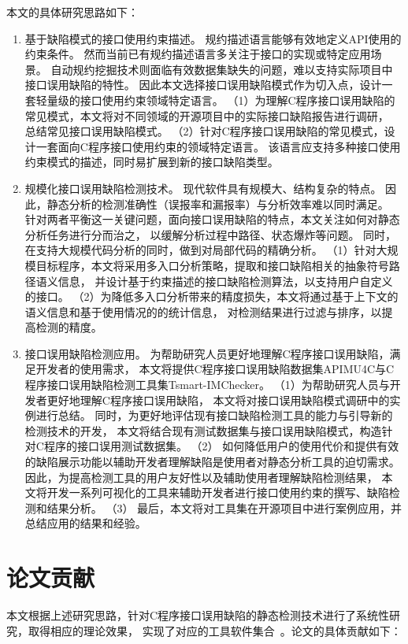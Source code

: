本文的具体研究思路如下：
\begin{enumerate}
	\item {\kaishu 基于缺陷模式的接口使用约束描述。}
	规约描述语言能够有效地定义API使用的约束条件。
	然而当前已有规约描述语言多关注于接口的实现或特定应用场景。
	自动规约挖掘技术则面临有效数据集缺失的问题，难以支持实际项目中接口误用缺陷的特性。
	因此本文选择接口误用缺陷模式作为切入点，设计一套轻量级的接口使用约束领域特定语言。
	（1）为理解C程序接口误用缺陷的常见模式，本文将对不同领域的开源项目中的实际接口缺陷报告进行调研，
	总结常见接口误用缺陷模式。
	（2）针对C程序接口误用缺陷的常见模式，设计一套面向C程序接口使用约束的领域特定语言。
	该语言应支持多种接口使用约束模式的描述，同时易扩展到新的接口缺陷类型。
	
	\item {\kaishu 规模化接口误用缺陷检测技术。}
	现代软件具有规模大、结构复杂的特点。
	因此，静态分析的检测准确性（误报率和漏报率）与分析效率难以同时满足。
	针对两者平衡这一关键问题，面向接口误用缺陷的特点，本文关注如何对静态分析任务进行分而治之，
	以缓解分析过程中路径、状态爆炸等问题。
	同时，在支持大规模代码分析的同时，做到对局部代码的精确分析。
	（1）针对大规模目标程序，本文将采用多入口分析策略，提取和接口缺陷相关的抽象符号路径语义信息，
	并设计基于约束描述的接口缺陷检测算法，以支持用户自定义的接口。
	（2）为降低多入口分析带来的精度损失，本文将通过基于上下文的语义信息和基于使用情况的的统计信息，
	对检测结果进行过滤与排序，以提高检测的精度。
	
	\item {\kaishu 接口误用缺陷检测应用。}
	为帮助研究人员更好地理解C程序接口误用缺陷，满足开发者的使用需求，
	本文将提供C程序接口误用缺陷数据集APIMU4C与C程序接口误用缺陷检测工具集Tsmart-IMChecker。
	（1）为帮助研究人员与开发者更好地理解C程序接口误用缺陷，
	本文将对接口误用缺陷模式调研中的实例进行总结。
	同时，为更好地评估现有接口缺陷检测工具的能力与引导新的检测技术的开发，
	本文将结合现有测试数据集与接口误用缺陷模式，构造针对C程序的接口误用测试数据集。
	（2）
	如何降低用户的使用代价和提供有效的缺陷展示功能以辅助开发者理解缺陷是使用者对静态分析工具的迫切需求。
	因此，为提高检测工具的用户友好性以及辅助使用者理解缺陷检测结果，
	本文将开发一系列可视化的工具来辅助开发者进行接口使用约束的撰写、缺陷检测和结果分析。
	（3）
	最后，本文将对工具集在开源项目中进行案例应用，并总结应用的结果和经验。	
\end{enumerate}




\section{论文贡献}
本文根据上述研究思路，针对C程序接口误用缺陷的静态检测技术进行了系统性研究，取得相应的理论效果，
实现了对应的工具软件集合~\cite{19-icse-imchecker}。论文的具体贡献如下：


